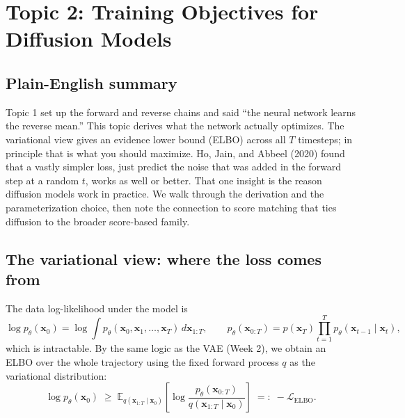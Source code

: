 \documentclass[11pt]{article}
\newcommand{\E}{\mathbb{E}}
\theoremstyle{remark}
\begin{document}
\section{Topic 2: Training Objectives for Diffusion Models}

\subsection{Plain-English summary}

Topic 1 set up the forward and reverse chains and said ``the neural network learns the reverse mean.'' This topic derives what the network actually optimizes. The variational view gives an evidence lower bound (ELBO) across all $T$ timesteps; in principle that is what you should maximize. Ho, Jain, and Abbeel (2020) found that a vastly simpler loss, just predict the noise that was added in the forward step at a random $t$, works as well or better. That one insight is the reason diffusion models work in practice. We walk through the derivation and the parameterization choice, then note the connection to score matching that ties diffusion to the broader score-based family.

\subsection{The variational view: where the loss comes from}

The data log-likelihood under the model is
\begin{equation}
\log p_\theta(\mathbf{x}_0) = \log \int p_\theta(\mathbf{x}_0, \mathbf{x}_1, \dots, \mathbf{x}_T)\, d\mathbf{x}_{1:T},
\qquad
p_\theta(\mathbf{x}_{0:T}) = p(\mathbf{x}_T)\prod_{t=1}^{T} p_\theta(\mathbf{x}_{t-1} \mid \mathbf{x}_t),
\end{equation}
which is intractable. By the same logic as the VAE (Week 2), we obtain an ELBO over the whole trajectory using the fixed forward process $q$ as the variational distribution:
\begin{equation}
\log p_\theta(\mathbf{x}_0) \;\geq\; \E_{q(\mathbf{x}_{1:T}\mid \mathbf{x}_0)}\!\left[ \log \frac{p_\theta(\mathbf{x}_{0:T})}{q(\mathbf{x}_{1:T} \mid \mathbf{x}_0)} \right] \;=:\; -\mathcal{L}_{\text{ELBO}}.
\label{eq:elbo}
\end{equation}
\end{document}
